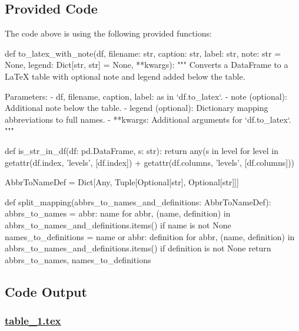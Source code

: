 \documentclass[11pt]{article}
\begin{document}
\subsection{Provided Code}
The code above is using the following provided functions:

\begin{python}
def to_latex_with_note(df, filename: str, caption: str, label: str, note: str = None, legend: Dict[str, str] = None, **kwargs):
    """
    Converts a DataFrame to a LaTeX table with optional note and legend added below the table.

    Parameters:
    - df, filename, caption, label: as in `df.to_latex`.
    - note (optional): Additional note below the table.
    - legend (optional): Dictionary mapping abbreviations to full names.
    - **kwargs: Additional arguments for `df.to_latex`.
    """

def is_str_in_df(df: pd.DataFrame, s: str):
    return any(s in level for level in getattr(df.index, 'levels', [df.index]) + getattr(df.columns, 'levels', [df.columns]))

AbbrToNameDef = Dict[Any, Tuple[Optional[str], Optional[str]]]

def split_mapping(abbrs_to_names_and_definitions: AbbrToNameDef):
    abbrs_to_names = {abbr: name for abbr, (name, definition) in abbrs_to_names_and_definitions.items() if name is not None}
    names_to_definitions = {name or abbr: definition for abbr, (name, definition) in abbrs_to_names_and_definitions.items() if definition is not None}
    return abbrs_to_names, names_to_definitions

\end{python}



\subsection{Code Output}

\subsubsection*{\hyperlink{code-LaTeX Table Design-table-1-tex}{table\_1.tex}}
\end{document}
